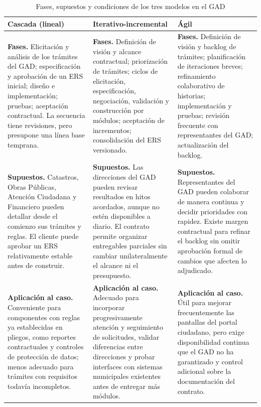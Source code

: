 \documentclass[conference,onecolumn]{IEEEtran}
\begin{document}
\begin{table}[H]
\caption{Fases, supuestos y condiciones de los tres modelos en el GAD}
\label{tab:modelos}
\centering
\footnotesize
\setlength{\tabcolsep}{4pt}
\renewcommand{\arraystretch}{1.24}
\begin{tabularx}{\linewidth}{@{}YYY@{}}
\toprule
\textbf{Cascada (lineal)} & \textbf{Iterativo-incremental} & \textbf{Ágil}\\
\midrule
\textbf{Fases.} Elicitación y análisis de los trámites del GAD; especificación y aprobación de un ERS inicial; diseño e implementación; pruebas; aceptación contractual. La secuencia tiene revisiones, pero presupone una línea base temprana. &
\textbf{Fases.} Definición de visión y alcance contractual; priorización de trámites; ciclos de elicitación, especificación, negociación, validación y construcción por módulos; aceptación de incrementos; consolidación del ERS versionado. &
\textbf{Fases.} Definición de visión y backlog de trámites; planificación de iteraciones breves; refinamiento colaborativo de historias; implementación y pruebas; revisión frecuente con representantes del GAD; actualización del backlog.\\
\midrule
\textbf{Supuestos.} Catastros, Obras Públicas, Atención Ciudadana y Financiero pueden detallar desde el comienzo sus trámites y reglas. El cliente puede aprobar un ERS relativamente estable antes de construir. &
\textbf{Supuestos.} Las direcciones del GAD pueden revisar resultados en hitos acordados, aunque no estén disponibles a diario. El contrato permite organizar entregables parciales sin cambiar unilateralmente el alcance ni el presupuesto. &
\textbf{Supuestos.} Representantes del GAD pueden colaborar de manera continua y decidir prioridades con rapidez. Existe margen contractual para refinar el backlog sin omitir aprobación formal de cambios que afecten lo adjudicado.\\
\midrule
\textbf{Aplicación al caso.} Conveniente para componentes con reglas ya establecidas en pliegos, como reportes contractuales y controles de protección de datos; menos adecuado para trámites con requisitos todavía incompletos. &
\textbf{Aplicación al caso.} Adecuado para incorporar progresivamente atención y seguimiento de solicitudes, validar diferencias entre direcciones y probar interfaces con sistemas municipales existentes antes de entregar más módulos. &
\textbf{Aplicación al caso.} Útil para mejorar frecuentemente las pantallas del portal ciudadano, pero exige disponibilidad continua que el GAD no ha garantizado y control adicional sobre la documentación del contrato.\\
\bottomrule
\end{tabularx}
\end{table}
\end{document}

